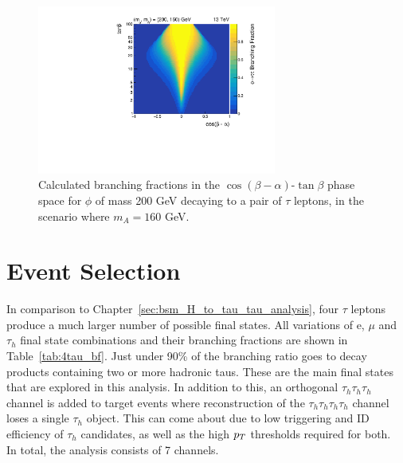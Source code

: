 \begin{figure}[!hbtp]
\centering
    \includegraphics[width=0.7\textwidth]{Figures/phi_branching_fractions_mphi200_mA160.pdf}
\caption{Calculated branching fractions in the $\cos(\beta-\alpha)$-$\tan\beta$ phase space for $\phi$ of mass 200 GeV decaying to a pair of $\tau$ leptons, in the scenario where $m_A = 160$ GeV.}
\label{fig:4tau_br_2d}
\end{figure}

\section{Event Selection}

In comparison to Chapter~\ref{sec:bsm_H_to_tau_tau_analysis}, four $\tau$ leptons produce a much larger number of possible final states. 
All variations of e, $\mu$ and $\tau_h$ final state combinations and their branching fractions are shown in Table~\ref{tab:4tau_bf}.
Just under 90\% of the branching ratio goes to decay products containing two or more hadronic taus.
These are the main final states that are explored in this analysis. 
In addition to this, an orthogonal $\tau_h \tau_h \tau_h$ channel is added to target events where reconstruction of the $\tau_h \tau_h \tau_h \tau_h$ channel loses a single $\tau_h$ object.
This can come about due to low triggering and ID efficiency of $\tau_h$ candidates, as well as the high $p_{T}$ thresholds required for both. \\
In total, the analysis consists of 7 channels.

